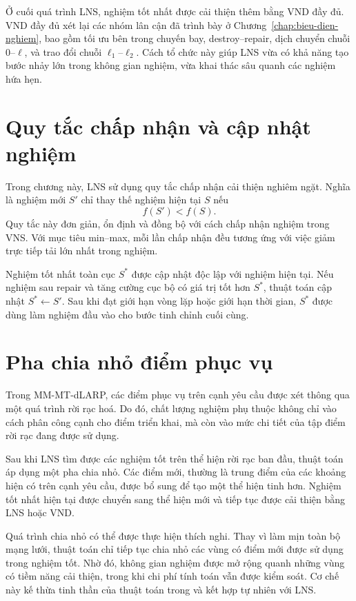 Ở cuối quá trình LNS, nghiệm tốt nhất được cải thiện thêm bằng VND đầy đủ. VND đầy đủ xét lại các nhóm lân cận đã trình bày ở Chương~\ref{chap:bieu-dien-nghiem}, bao gồm tối ưu bên trong chuyến bay, destroy--repair, dịch chuyển chuỗi $0$--$\ell$, và trao đổi chuỗi $\ell_1$--$\ell_2$. Cách tổ chức này giúp LNS vừa có khả năng tạo bước nhảy lớn trong không gian nghiệm, vừa khai thác sâu quanh các nghiệm hứa hẹn.

\section{Quy tắc chấp nhận và cập nhật nghiệm}
\label{sec:lns-acceptance}

Trong chương này, LNS sử dụng quy tắc chấp nhận cải thiện nghiêm ngặt. Nghĩa là nghiệm mới $S'$ chỉ thay thế nghiệm hiện tại $S$ nếu
\begin{equation}
f(S') < f(S).
\label{eq:lns-acceptance}
\end{equation}
Quy tắc này đơn giản, ổn định và đồng bộ với cách chấp nhận nghiệm trong VNS. Với mục tiêu min--max, mỗi lần chấp nhận đều tương ứng với việc giảm trực tiếp tải lớn nhất trong nghiệm.

Nghiệm tốt nhất toàn cục $S^*$ được cập nhật độc lập với nghiệm hiện tại. Nếu nghiệm sau repair và tăng cường cục bộ có giá trị tốt hơn $S^*$, thuật toán cập nhật $S^* \leftarrow S'$. Sau khi đạt giới hạn vòng lặp hoặc giới hạn thời gian, $S^*$ được dùng làm nghiệm đầu vào cho bước tinh chỉnh cuối cùng.

\section{Pha chia nhỏ điểm phục vụ}
\label{sec:lns-splitting}

Trong MM-MT-dLARP, các điểm phục vụ trên cạnh yêu cầu được xét thông qua một quá trình rời rạc hoá. Do đó, chất lượng nghiệm phụ thuộc không chỉ vào cách phân công cạnh cho điểm triển khai, mà còn vào mức chi tiết của tập điểm rời rạc đang được sử dụng.

Sau khi LNS tìm được các nghiệm tốt trên thể hiện rời rạc ban đầu, thuật toán áp dụng một pha chia nhỏ. Các điểm mới, thường là trung điểm của các khoảng hiện có trên cạnh yêu cầu, được bổ sung để tạo một thể hiện tinh hơn. Nghiệm tốt nhất hiện tại được chuyển sang thể hiện mới và tiếp tục được cải thiện bằng LNS hoặc VND.

Quá trình chia nhỏ có thể được thực hiện thích nghi. Thay vì làm mịn toàn bộ mạng lưới, thuật toán chỉ tiếp tục chia nhỏ các vùng có điểm mới được sử dụng trong nghiệm tốt. Nhờ đó, không gian nghiệm được mở rộng quanh những vùng có tiềm năng cải thiện, trong khi chi phí tính toán vẫn được kiểm soát. Cơ chế này kế thừa tinh thần của thuật toán trong \cite{corberan2025mmdlarp} và kết hợp tự nhiên với LNS.

